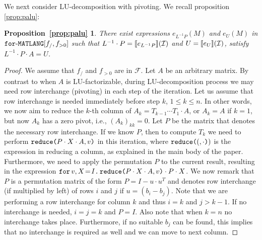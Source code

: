 \newtheorem*{PALU}{Proposition~\ref{prop:palu}}
We next consider LU-decomposition with pivoting. We recall proposition \ref{prop:palu}:

\begin{PALU}
  There exist expressions $e_{L^{-1}P}(M)$ and $e_U(M)$ in $\langforf{f_/,f_{>0}}$  such that
  $L^{-1}\cdot P=\sem{e_{L^{-1}P}}{\I}$ and $U=\sem{e_U}{\I}$, satisfy $L^{-1}\cdot P\cdot A=U$.
\end{PALU}
\begin{proof}
We assume that $f_{/}$ and $f_{>0}$ are in $\mathcal{F}$. Let $A$ be an arbitrary matrix.
%
By contrast to when $A$ is LU-factorizable, during LU-decomposition process we may need row interchange (pivoting) in each step of the iteration. Let us assume that row interchange is needed immediately before 
step $k$, $1\leq k\leq n$. In other words, we now aim to reduce the $k$-th column of $A_k=T_{k-1}\cdots T_1\cdot A$, 
or $A_k=A$ if $k=1$, but now $A_k$ has a zero pivot, i.e., $(A_{k})_{kk}=0$. 
Let $P$ be the matrix that denotes the necessary row interchange. If we know
$P$, then 
to compute $T_k$ we need to perform $\red{P\cdot X\cdot A}{v}$ in this iteration,
where $\red(\cdot)$ is the expression in \langfor reducing a column, as explained in the main body of the paper.
Furthermore, we need to apply the permutation $P$ to the current result, resulting in the 
expression $\initf{I}{v}{X}{\red{P\cdot X\cdot A}{v}\cdot P\cdot X}$. We now remark that
$P$ is a permutation matrix of the  form $P = I - u\cdot u^T$ and denotes row interchange (if multiplied by left) 
of rows $i$ and $j$ if $u=(b_{i}-b_{j})$. Note that we are performing a row interchange for column $k$ and thus $i=k$ and $j>k-1$. If no interchange is needed, $i=j=k$ and $P=I$.
Also note that when $k=n$ no interchange takes place. Furthermore, if no suitable $b_j$ can
be found, this implies that no interchange is required as well and we can move to next column.


\end{proof}
